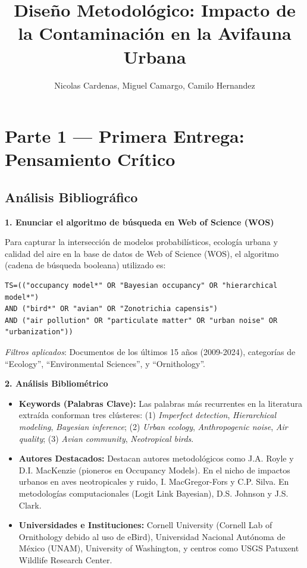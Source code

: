 \documentclass[12pt]{article}
\title{Diseño Metodológico: Impacto de la Contaminación en la Avifauna Urbana}
\author{Nicolas Cardenas, Miguel Camargo, Camilo Hernandez}
\date{}
\begin{document}
\maketitle

\section{Parte 1 --- Primera Entrega: Pensamiento Crítico}

\subsection*{Análisis Bibliográfico}

\textbf{1. Enunciar el algoritmo de búsqueda en Web of Science (WOS)}

Para capturar la intersección de modelos probabilísticos, ecología urbana y calidad del aire en la base de datos de Web of Science (WOS), el algoritmo (cadena de búsqueda booleana) utilizado es:
\begin{verbatim}
TS=(("occupancy model*" OR "Bayesian occupancy" OR "hierarchical model*") 
AND ("bird*" OR "avian" OR "Zonotrichia capensis") 
AND ("air pollution" OR "particulate matter" OR "urban noise" OR "urbanization"))
\end{verbatim}
\textit{Filtros aplicados}: Documentos de los últimos 15 años (2009-2024), categorías de ``Ecology'', ``Environmental Sciences'', y ``Ornithology''.

\vspace{0.5cm}
\textbf{2. Análisis Bibliométrico}
\begin{itemize}[leftmargin=*]
    \item \textbf{Keywords (Palabras Clave):} Las palabras más recurrentes en la literatura extraída conforman tres clústeres: (1) \textit{Imperfect detection}, \textit{Hierarchical modeling}, \textit{Bayesian inference}; (2) \textit{Urban ecology}, \textit{Anthropogenic noise}, \textit{Air quality}; (3) \textit{Avian community}, \textit{Neotropical birds}.
    \item \textbf{Autores Destacados:} Destacan autores metodológicos como J.A. Royle y D.I. MacKenzie (pioneros en Occupancy Models). En el nicho de impactos urbanos en aves neotropicales y ruido, I. MacGregor-Fors y C.P. Silva. En metodologías computacionales (Logit Link Bayesian), D.S. Johnson y J.S. Clark.
    \item \textbf{Universidades e Instituciones:} Cornell University (Cornell Lab of Ornithology debido al uso de eBird), Universidad Nacional Autónoma de México (UNAM), University of Washington, y centros como USGS Patuxent Wildlife Research Center.
\end{itemize}
\end{document}
